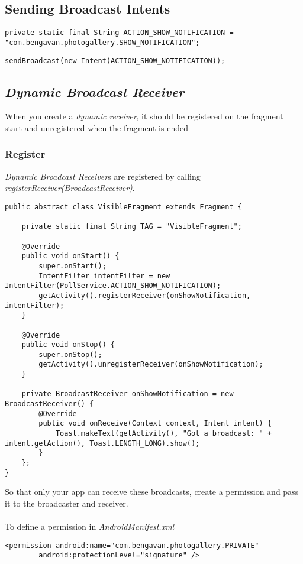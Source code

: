 \documentclass[]{article}
\renewcommand{\it}[1]{\textit{#1}}
\begin{document}
\subsection{Sending Broadcast Intents}
\begin{lstlisting}
private static final String ACTION_SHOW_NOTIFICATION = "com.bengavan.photogallery.SHOW_NOTIFICATION";
\end{lstlisting}
\begin{lstlisting}
sendBroadcast(new Intent(ACTION_SHOW_NOTIFICATION));
\end{lstlisting}

\subsection{\it{Dynamic Broadcast Receiver}}
When you create a \it{dynamic receiver}, it should be registered on the fragment start and unregistered when the fragment is ended
\subsubsection{Register}
\it{Dynamic Broadcast Receiver}s are registered by calling \it{registerReceiver(BroadcastReceiver)}.

\begin{lstlisting}
public abstract class VisibleFragment extends Fragment {
	
	private static final String TAG = "VisibleFragment";
	
	@Override
	public void onStart() {
		super.onStart();
		IntentFilter intentFilter = new IntentFilter(PollService.ACTION_SHOW_NOTIFICATION);
		getActivity().registerReceiver(onShowNotification, intentFilter);
	}
	
	@Override
	public void onStop() {
		super.onStop();
		getActivity().unregisterReceiver(onShowNotification);
	}
	
	private BroadcastReceiver onShowNotification = new BroadcastReceiver() {
		@Override
		public void onReceive(Context context, Intent intent) {
			Toast.makeText(getActivity(), "Got a broadcast: " + intent.getAction(), Toast.LENGTH_LONG).show();
		}
	};
}
\end{lstlisting}

So that only your app can receive these broadcasts, create a permission and pass it to the broadcaster and receiver.
\\\\
To define a permission in \it{AndroidManifest.xml}
\begin{lstlisting}
<permission android:name="com.bengavan.photogallery.PRIVATE"
		android:protectionLevel="signature" />
\end{lstlisting}
\end{document}
